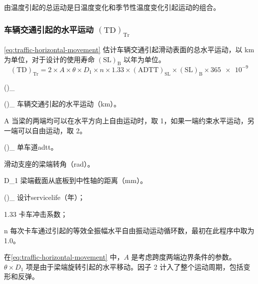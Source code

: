 由温度引起的总运动是日温度变化和季节性温度变化引起运动的组合。

\subsubsection{车辆交通引起的水平运动 $(\text{TD})_\text{Tr}$}
\cref{eq:traffic-horizontal-movement} 估计车辆交通引起滑动表面的总水平运动，以 \unit{km} 为单位，对于设计的使用寿命 $(\text{SL})_\text{B}$ 以年为单位。
\begin{equation}
  \label{eq:traffic-horizontal-movement}
  (\text{TD})_\text{Tr} = 2 \times A \times \theta \times D_1 \times n \times 1.33 \times (\text{ADTT})_\text{SL} \times (\text{SL})_\text{B} \times \num{365e-9}
\end{equation}
\begin{EqDesc}{()_}
  \item [(\text{TD})_\text{Tr}]车辆交通引起的水平运动（\unit{km}）。
  \item [A] 当梁的两端均可以在水平方向上自由运动时，取 1，如果一端约束水平运动，另一端可以自由运动，取 2。
  \item [(\text{ADTT})_\text{SL}] 单车道\acrfull*{adtt}。
  \item [\theta] 滑动支座的梁端转角（\unit{rad}）。
  \item [D_1] 梁端截面从底板到中性轴的距离（\unit{mm}）。
  \item [(\text{SL})_\text{B}] 设计\gls*{servicelife}（年）；
  \item [1.33] 卡车冲击系数；
  \item [n] 每次卡车通过引起的等效全振幅水平自由振动运动循环数，最初在此程序中取为 1.0。
\end{EqDesc}

在\cref{eq:traffic-horizontal-movement} 中，$A$ 是考虑跨度两端边界条件的参数。 $\theta \times D_1$ 项是由于梁端旋转引起的水平移动。因子 2 计入了整个运动周期，包括变形和反弹。

